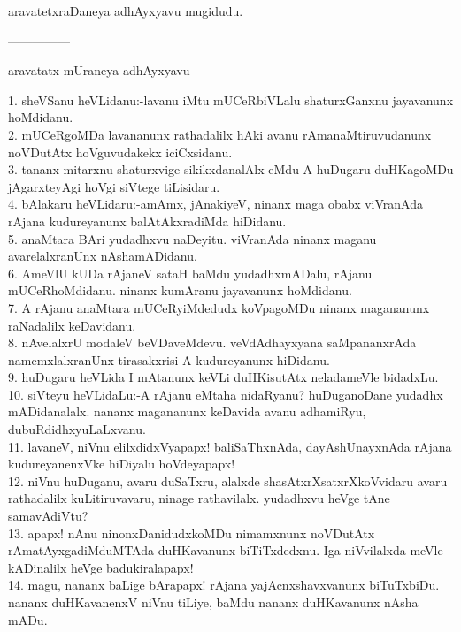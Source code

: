 \documentclass{article}
\begin{document}
\begin{center}
aravatetxraDaneya adhAyxyavu mugidudu.
\end{center}

\begin{center}
---------------
\end{center}

\begin{center}
aravatatx mUraneya adhAyxyavu
\end{center}

1. sheVSanu heVLidanu:-lavanu iMtu mUCeRbiVLalu shaturxGanxnu jayavanunx hoMdidanu.\\
2. mUCeRgoMDa lavananunx rathadalilx hAki avanu rAmanaMtiruvudanunx noVDutAtx hoVguvudakekx iciCxsidanu.\\
3. tananx mitarxnu shaturxvige sikikxdanalAlx eMdu A huDugaru duHKagoMDu jAgarxteyAgi hoVgi siVtege tiLisidaru.\\
4. bAlakaru heVLidaru:-amAmx, jAnakiyeV, ninanx maga obabx viVranAda rAjana kudureyanunx balAtAkxradiMda hiDidanu.\\
5. anaMtara BAri yudadhxvu naDeyitu. viVranAda ninanx maganu avarelalxranUnx nAshamADidanu.\\
6. AmeVlU kUDa rAjaneV sataH baMdu yudadhxmADalu, rAjanu mUCeRhoMdidanu. ninanx kumAranu jayavanunx hoMdidanu.\\
7. A rAjanu anaMtara mUCeRyiMdedudx koVpagoMDu ninanx magananunx raNadalilx keDavidanu.\\
8. nAvelalxrU modaleV beVDaveMdevu. veVdAdhayxyana saMpananxrAda namemxlalxranUnx tirasakxrisi A kudureyanunx hiDidanu.\\
9. huDugaru heVLida I mAtanunx keVLi duHKisutAtx neladameVle bidadxLu.\\
10. siVteyu heVLidaLu:-A rAjanu eMtaha nidaRyanu? huDuganoDane yudadhx mADidanalalx. nananx magananunx keDavida avanu adhamiRyu, dubuRdidhxyuLaLxvanu.\\
11. lavaneV, niVnu elilxdidxVyapapx! baliSaThxnAda, dayAshUnayxnAda rAjana kudureyanenxVke hiDiyalu hoVdeyapapx!\\
12. niVnu huDuganu, avaru duSaTxru, alalxde shasAtxrXsatxrXkoVvidaru avaru rathadalilx kuLitiruvavaru, ninage rathavilalx. yudadhxvu heVge tAne samavAdiVtu?\\
13. apapx! nAnu ninonxDanidudxkoMDu nimamxnunx noVDutAtx rAmatAyxgadiMduMTAda duHKavanunx biTiTxdedxnu. Iga niVvilalxda meVle kADinalilx heVge badukiralapapx!\\
14. magu, nananx baLige bArapapx! rAjana yajAcnxshavxvanunx biTuTxbiDu. nananx duHKavanenxV niVnu tiLiye, baMdu nananx duHKavanunx nAsha mADu.\\
\end{document}
